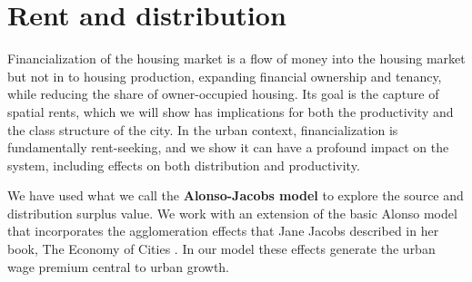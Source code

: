 
\section{Rent and distribution}



Financialization of the housing market is a flow of money into the housing market but not in to housing production, expanding financial ownership and tenancy, while reducing the share of owner-occupied housing. Its goal is the capture of spatial rents, which we will show has implications for both the productivity and the class structure of the city. 
In the urban context, financialization is fundamentally \gls{rent-seeking}, and we show it can have a profound impact on the system, including effects on both distribution and productivity. 



We have used what we call the  \textbf{\gls{Alonso-Jacobs model}} to explore the source and distribution surplus value. We  work with an extension of the basic Alonso model that incorporates the \glspl{agglomeration effect} that Jane Jacobs  described in her book, The Economy of Cities \cite{jacobsEconomyCities1969}. In our model these effects generate the \gls{urban wage premium} central to urban growth. %

